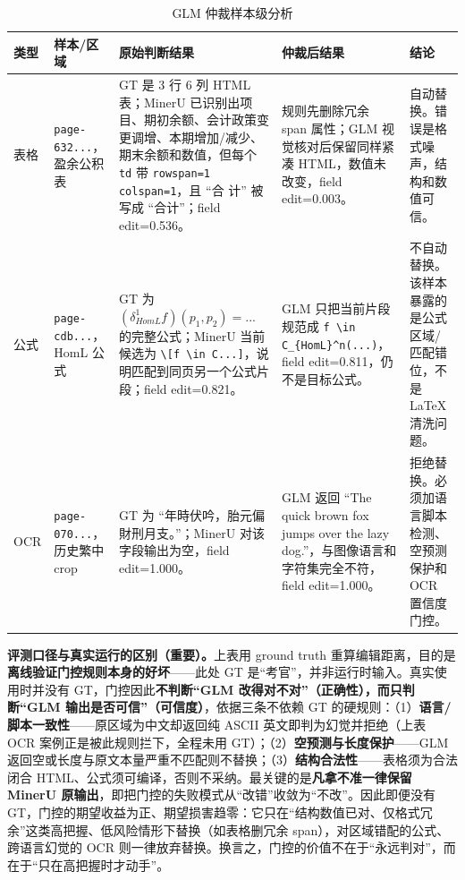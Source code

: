 \documentclass[UTF8,a4paper,11pt]{ctexart}
\begin{document}
\begin{table}[H]
\centering
\caption{GLM 仲裁样本级分析}
\label{tab:glm-cases}
\scriptsize
\begin{tabularx}{\linewidth}{p{1.35cm}p{2.2cm}X X p{1.75cm}}
\toprule
类型 & 样本/区域 & 原始判断结果 & 仲裁后结果 & 结论 \\
\midrule
表格 & \texttt{page-632...}，盈余公积表 & GT 是 3 行 6 列 HTML 表；MinerU 已识别出项目、期初余额、会计政策变更调增、本期增加/减少、期末余额和数值，但每个 \texttt{td} 带 \texttt{rowspan=1 colspan=1}，且 ``合 计'' 被写成 ``合计''；field edit=0.536。 & 规则先删除冗余 span 属性；GLM 视觉核对后保留同样紧凑 HTML，数值未改变，field edit=0.003。 & 自动替换。错误是格式噪声，结构和数值可信。\\
公式 & \texttt{page-cdb...}，HomL 公式 & GT 为 \((\delta^1_{HomL} f)(p_1,p_2)=...\) 的完整公式；MinerU 当前候选为 \texttt{\textbackslash[f \textbackslash in C...]}，说明匹配到同页另一个公式片段；field edit=0.821。 & GLM 只把当前片段规范成 \texttt{f \textbackslash in C\_\{HomL\}\textasciicircum{}n(...)}，field edit=0.811，仍不是目标公式。 & 不自动替换。该样本暴露的是公式区域/匹配错位，不是 LaTeX 清洗问题。\\
OCR & \texttt{page-070...}，历史繁中 crop & GT 为 ``年時伏吟，胎元偏財刑月支。''；MinerU 对该字段输出为空，field edit=1.000。 & GLM 返回 ``The quick brown fox jumps over the lazy dog.''，与图像语言和字符集完全不符，field edit=1.000。 & 拒绝替换。必须加语言脚本检测、空预测保护和 OCR 置信度门控。\\
\bottomrule
\end{tabularx}
\end{table}

\textbf{评测口径与真实运行的区别（重要）。}上表用 ground truth 重算编辑距离，目的是\textbf{离线验证门控规则本身的好坏}——此处 GT 是``考官''，并非运行时输入。真实使用时并没有 GT，门控因此\textbf{不判断``GLM 改得对不对''（正确性），而只判断``GLM 输出是否可信''（可信度）}，依据三条不依赖 GT 的硬规则：（1）\textbf{语言/脚本一致性}——原区域为中文却返回纯 ASCII 英文即判为幻觉并拒绝（上表 OCR 案例正是被此规则拦下，全程未用 GT）；（2）\textbf{空预测与长度保护}——GLM 返回空或长度与原文本量严重不匹配则不替换；（3）\textbf{结构合法性}——表格须为合法闭合 HTML、公式须可编译，否则不采纳。最关键的是\textbf{凡拿不准一律保留 MinerU 原输出}，即把门控的失败模式从``改错''收敛为``不改''。因此即便没有 GT，门控的期望收益为正、期望损害趋零：它只在``结构数值已对、仅格式冗余''这类高把握、低风险情形下替换（如表格删冗余 span），对区域错配的公式、跨语言幻觉的 OCR 则一律放弃替换。换言之，门控的价值不在于``永远判对''，而在于``只在高把握时才动手''。
\end{document}
